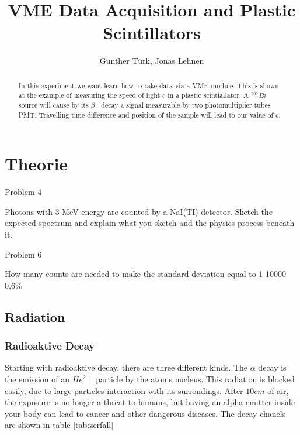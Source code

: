 \documentclass[]{article}
\title{VME Data Acquisition and Plastic Scintillators}
\author{Gunther T\"urk, Jonas Lehnen}
\begin{document}
\maketitle
\begin{abstract}
In this experiment we want learn how to take data via a VME module. This is shown at the example of measuring the speed of light $c$ in a plastic scintiallator. A $^{207}Bi$ source will cause by its $\beta^-$ decay a signal measurable by two photomultiplier tubes PMT. Travelling time difference and position of the sample will lead to our value of c.

\end{abstract}

\tableofcontents

\newpage
\section{Theorie}








Problem 4 

Photons with 3 MeV energy are counted by a NaI(TI) detector. Sketch the expected spectrum and explain what you sketch and the physics process beneath it. 


Problem 6 

How many counts are needed to make the standard deviation equal to 1%
10000
0,6\%

\subsection{Radiation}\label{radiation}
\subsubsection{Radioaktive Decay}
Starting with radioaktive decay, there are three different kinds. The $\alpha$ decay is the emission of an $He^{2+}$ particle by the atoms nucleus. This radiation is blocked easily, due to large particles interaction with its surrondings. After $10cm$ of air, the exposure is no longer a threat to humans, but having an alpha emitter inside your body can lead to cancer and other dangerous diseases. The decay chanels are shown in table  \ref{tab:zerfall}
\end{document}
